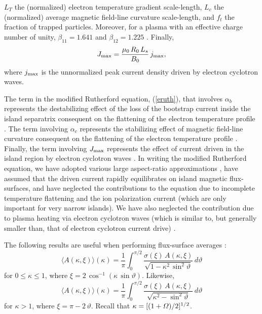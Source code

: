 \documentclass{iopjournal}
\begin{document}
$L_T$ the (normalized) electron temperature gradient scale-length, $L_c$ the (normalized) average magnetic field-line curvature scale-length, and $f_t$  the fraction of trapped particles. Moreover, for a plasma with an effective charge
number of unity, $\beta_{11}=1.641$ and $\beta_{12}= 1.225$ \cite{fitz}.
Finally,
\begin{equation}\label{ecur}
J_{\rm max} = \frac{\mu_0\,R_0\,L_s}{B_0}\,j_{\rm max},
\end{equation}
where $j_{\rm max}$ is the unnormalized peak current density driven by electron cyclotron waves.  
 
 The term in the modified Rutherford equation, (\ref{eruth}),  that involves $\alpha_b$  represents  the
 destabilizing effect of the loss of the bootstrap current inside the island separatrix consequent on the flattening of the electron temperature profile \cite{ntm2,car}. The term involving $\alpha_c$ represents  the stabilizing effect of  magnetic field-line curvature  consequent on the flattening of the electron temperature profile \cite{fitz,kot}. Finally, the term involving $J_{\rm max}$ represents the effect of current driven in the island region by electron cyclotron waves \cite{island}. In writing the modified
 Rutherford equation, we have adopted various large aspect-ratio approximations \cite{ggj1,fitz}, have assumed that the driven current rapidly equilibrates on
 island magnetic flux-surfaces, 
and have  neglected the contributions to the equation due to incomplete temperature flattening \cite{ntm2} and the ion polarization current \cite{polz} (which are only important for
 very narrow islands). We  have also neglected the contribution due to
 plasma heating via electron cyclotron waves (which is similar to, but generally smaller than, that of electron cyclotron current drive) \cite{ntm4,island}.
 
 The following results are useful when performing flux-surface averages \cite{island}:
\begin{equation}
\langle A(\kappa,\xi)\rangle(\kappa) = \frac{1}{\pi}\int_0^{\pi/2}\frac{\sigma(\xi)\,A(\kappa,\xi)}{\sqrt{1-\kappa^2\,\sin^2\vartheta}}\,d\vartheta
\end{equation}
for $0\leq \kappa\leq 1$, where $\xi=2\,\cos^{-1}(\kappa\,\sin\vartheta)$. Likewise, 
\begin{equation}
\langle A(\kappa,\xi)\rangle(\kappa) = \frac{1}{\pi}\int_0^{\pi/2}\frac{\sigma(\xi)\,A(\kappa,\xi)}{\sqrt{\kappa^2-\sin^2\vartheta}}\,d\vartheta
\end{equation}
for $\kappa>1$, where $\xi=\pi-2\,\vartheta$. Recall that $\kappa=[(1+{\mit\Omega})/2]^{1/2}$. 
\end{document}
